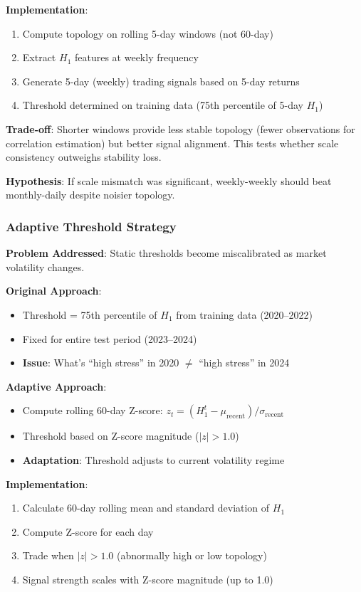 \textbf{Implementation}:
\begin{enumerate}
\item Compute topology on rolling 5-day windows (not 60-day)
\item Extract $H_1$ features at weekly frequency
\item Generate 5-day (weekly) trading signals based on 5-day returns
\item Threshold determined on training data (75th percentile of 5-day $H_1$)
\end{enumerate}

\textbf{Trade-off}: Shorter windows provide less stable topology (fewer observations for correlation estimation) but better signal alignment. This tests whether scale consistency outweighs stability loss.

\textbf{Hypothesis}: If scale mismatch was significant, weekly-weekly should beat monthly-daily despite noisier topology.

\subsubsection{Adaptive Threshold Strategy}

\textbf{Problem Addressed}: Static thresholds become miscalibrated as market volatility changes.

\textbf{Original Approach}:
\begin{itemize}
\item Threshold = 75th percentile of $H_1$ from training data (2020--2022)
\item Fixed for entire test period (2023--2024)
\item \textbf{Issue}: What's ``high stress'' in 2020 $\neq$ ``high stress'' in 2024
\end{itemize}

\textbf{Adaptive Approach}:
\begin{itemize}
\item Compute rolling 60-day Z-score: $z_t = (H_1^t - \mu_{\text{recent}}) / \sigma_{\text{recent}}$
\item Threshold based on Z-score magnitude ($|z| > 1.0$)
\item \textbf{Adaptation}: Threshold adjusts to current volatility regime
\end{itemize}

\textbf{Implementation}:
\begin{enumerate}
\item Calculate 60-day rolling mean and standard deviation of $H_1$
\item Compute Z-score for each day
\item Trade when $|z| > 1.0$ (abnormally high or low topology)
\item Signal strength scales with Z-score magnitude (up to 1.0)
\end{enumerate}

